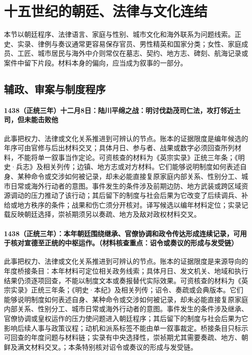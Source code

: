 \section{十五世纪的朝廷、法律与文化连结}

本节以朝廷程序、法律语言、家庭与性别、城市文化和海外联系为问题线索。正史、实录、律例与奏议通常更容易保存官员、男性精英和国家分类；女性、家庭成员、工匠、城市居民与海外中介则常仅在墓志、契约、地方志、碑刻、航海记录或案件中留下片段。材料本身的偏向，应当成为叙事的一部分。

\subsection{辅政、审案与制度程序}

\paragraph{1438（正统三年）十二月8日：陆川平绵之战：明讨伐勐茂司仁法，攻打邻近土司，但未能击败他} 此事把权力、法律或文化关系推进到可辨认的节点。账本的证据限度是编年候选的年序可由官修与后出材料交叉；具体月日、参与者、战果或数字必须回查所列材料，不能将单一叙事当作定论。可资核查的材料为《英宗实录》正统三年条；《明史·兵志》及相关列传；边镇、地方志或对方材料。它们能够说明制度如何表述自身、某种命令或交涉如何被记录，却未必能直接复原家庭内部关系、性别分工、城市日常或海外行动者的意图。事件发生的条件涉及前期边防、地方武装或跨区域资源调动的压力推动了该行动；其后留下的制度与社会后果为它改变了后续调兵、补给或地方秩序的条件；战果和伤亡须分开核对。译写候选以编年材料定位；实录记载反映朝廷选择，崇祯期须另以奏疏、地方及敌对政权材料交叉。

\paragraph{1438（正统三年）：本年朝廷围绕继承、官僚协调和政令传达形成连续记录，可用于核对宣德至正统的中枢运作。（材料核查重点：诏令或奏议的形成与发受链）} 此事把权力、法律或文化关系推进到可辨认的节点。账本的证据限度是来源导向的年度桥接条目：本年材料可定位相关政务线索；具体月日、发文机关、地域和执行结果仍须逐项回查，不能以制度文本或奏报替代实际效果。可资核查的材料为《英宗实录》正统三年条；《明史·本纪》及相关列传；诏令、奏疏或会典版本。它们能够说明制度如何表述自身、某种命令或交涉如何被记录，却未必能直接复原家庭内部关系、性别分工、城市日常或海外行动者的意图。事件发生的条件涉及继承、官僚协调或皇权运作的压力使问题进入朝廷程序；其后留下的制度与社会后果为它影响后续人事与政策议程；动机和派系标签不能由单一叙事裁定。桥接条目只标示可回查的年度问题与材料链；实录有中央选择性，崇祯期尤其需要奏疏、地方、朝鲜及满文材料交叉。；本条特别核对诏令或奏议的形成与发受链。


